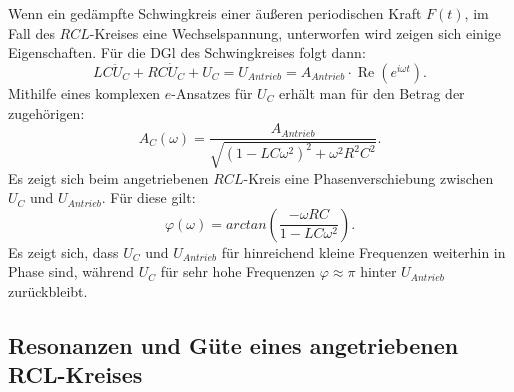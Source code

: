 Wenn ein gedämpfte Schwingkreis einer äußeren periodischen Kraft $F(t)$, im Fall des $RCL$-Kreises
 eine Wechselspannung, unterworfen wird zeigen sich einige Eigenschaften.
Für die DGl des Schwingkreises folgt dann:
\begin{equation}
  LC \ddot{U}_C + RC \dot{U}_C + U_C = U_{Antrieb} =A_{Antrieb} \cdot \operatorname{Re}\left( e^{i\omega t}\right)\text{.}
\end{equation}
Mithilfe eines komplexen $e$-Ansatzes für $U_C$ erhält man für den Betrag der zugehörigen:
\begin{equation}
  A_C(\omega) = \frac{A_{Antrieb}}{\sqrt{(1-LC\omega^2)^2 + \omega^2R^2C^2}}\text{.}
\end{equation}
Es zeigt sich beim angetriebenen $RCL$-Kreis eine Phasenverschiebung zwischen $U_C$ und $U_{Antrieb}$.
Für diese gilt:
\begin{equation}
  \varphi(\omega) = arctan\left( \frac{-\omega RC}{1-LC \omega^2}\right)\text{.}
\end{equation}
Es zeigt sich, dass $U_C$ und $U_{Antrieb}$ für hinreichend kleine Frequenzen weiterhin in Phase sind,
während $U_C$ für sehr hohe Frequenzen $\varphi \approx \pi$ hinter $U_{Antrieb}$ zurückbleibt.



\subsection{Resonanzen und Güte eines angetriebenen RCL-Kreises}

